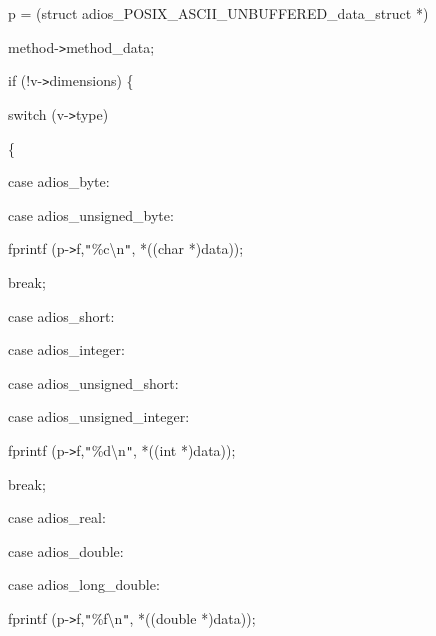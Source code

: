 \vspace{10pt}
p = (struct adios\_POSIX\_ASCII\_UNBUFFERED\_data\_struct *)

\vspace{10pt}
\parindent=154pt
method-\texttt{>}method\_data;

\vspace{10pt}
\parindent=14pt
if (!v-\texttt{>}dimensions) \{

\vspace{10pt}
\parindent=28pt
switch (v-\texttt{>}type)

\vspace{10pt}
\{

\vspace{10pt}
\parindent=72pt
case adios\_byte:

\vspace{10pt}
\parindent=43pt
case adios\_unsigned\_byte:

\vspace{10pt}
\parindent=57pt
fprintf (p-\texttt{>}f,\texttt{"}\%c\textbackslash{}n\texttt{"}, *((char *)data)); 

\vspace{10pt}
break;

\vspace{10pt}
\parindent=100pt
case adios\_short:

\vspace{10pt}
\parindent=43pt
case adios\_integer:

\vspace{10pt}
case adios\_unsigned\_short:

\vspace{10pt}
\parindent=86pt
case adios\_unsigned\_integer:

\vspace{10pt}
\parindent=57pt
fprintf (p-\texttt{>}f,\texttt{"}\%d\textbackslash{}n\texttt{"}, *((int *)data)); 

\vspace{10pt}
break;

\vspace{10pt}
\parindent=100pt
case adios\_real:

\vspace{10pt}
\parindent=43pt
case adios\_double:

\vspace{10pt}
case adios\_long\_double:

\vspace{10pt}
\parindent=100pt
fprintf (p-\texttt{>}f,\texttt{"}\%f\textbackslash{}n\texttt{"}, *((double *)data)); 

